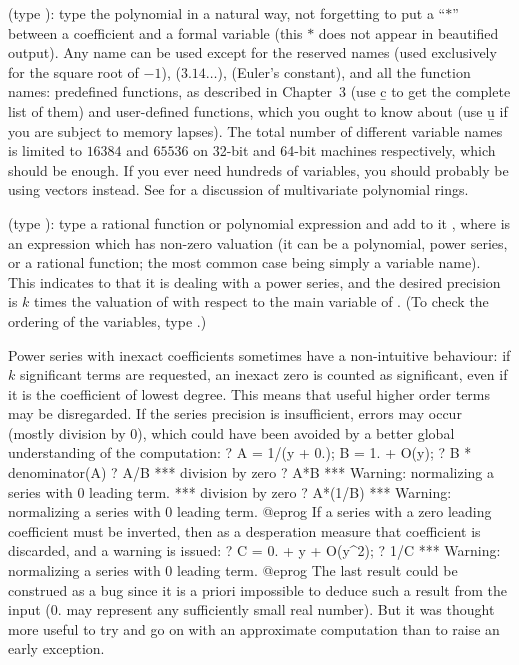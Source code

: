 \label{se:pol}
(type ): type the polynomial in a natural way, not
forgetting to put a ``$*$'' between a coefficient and a formal variable
(this $*$ does not appear in beautified output). Any  name
can be used except for the reserved names  (used exclusively for the
square root of $-1$),  ($3.14\dots$),  (Euler's
constant), and all the function names: predefined functions, as described
in Chapter~3 (use \b{c} to get the complete list of them) and user-defined
functions, which you ought to know about (use \b{u} if you are subject to
memory lapses). The total number of different variable names is limited to
$16384$ and $65536$ on 32-bit and 64-bit machines respectively, which
should be enough. If you ever need hundreds of variables, you should
probably be using vectors instead. See  for a discussion
of multivariate polynomial rings.

\label{se:series}
(type ): type a rational function or polynomial expression and add
to it \hbox{}, where  is an expression
which has non-zero valuation (it can be a polynomial, power series, or a
rational function; the most common case being simply a variable name). This
indicates to  that it is dealing with a power series, and the desired
precision is $k$ times the valuation of  with respect to the main
variable of . (To check the ordering of the variables, type
.)

 Power series with inexact coefficients sometimes have a
non-intuitive behaviour: if $k$ significant terms are requested, an inexact
zero is counted as significant, even if it is the coefficient of lowest
degree. This means that useful higher order terms may be disregarded.
If the series precision is insufficient, errors may occur (mostly division by
$0$), which could have been avoided by a better global understanding of the
computation:
\bprog
    ? A = 1/(y + 0.); B = 1. + O(y);
    ? B * denominator(A)
    ? A/B
    ***   division by zero
    ? A*B
    ***   Warning: normalizing a series with 0 leading term.
    ***   division by zero
    ? A*(1/B)
    ***   Warning: normalizing a series with 0 leading term.
@eprog\noindent
If a series with a zero leading coefficient must be inverted, then as a
desperation measure that coefficient is discarded, and a warning is issued:
\bprog
    ? C = 0. + y + O(y^2);
    ? 1/C
    ***   Warning: normalizing a series with 0 leading term.
@eprog\noindent
The last result could be construed as a bug since it is a priori impossible
to deduce such a result from the input ($0.$ may represent any sufficiently
small real number). But it was thought more useful to try and go on with an
approximate computation than to raise an early exception.

